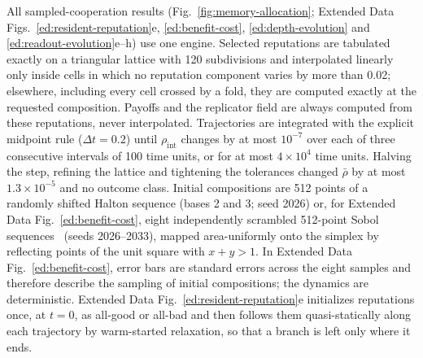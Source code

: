 All sampled-cooperation results (Fig.~\ref{fig:memory-allocation}; Extended
Data Figs.~\ref{ed:resident-reputation}e, \ref{ed:benefit-cost},
\ref{ed:depth-evolution} and \ref{ed:readout-evolution}e--h) use one engine.
Selected reputations are tabulated exactly on a triangular lattice with 120
subdivisions and interpolated linearly only inside cells in which no reputation
component varies by more than 0.02; elsewhere, including every cell crossed by
a fold, they are computed exactly at the requested composition. Payoffs and the
replicator field are always computed from these reputations, never
interpolated. Trajectories are integrated with the explicit midpoint rule
($\Delta t=0.2$) until $\rho_{\mathrm{int}}$ changes by at most $10^{-7}$ over
each of three consecutive intervals of 100 time units, or for at most
$4\times10^4$ time units. Halving the step, refining the lattice and tightening
the tolerances changed $\bar\rho$ by at most $1.3\times10^{-5}$ and no outcome
class. Initial compositions are 512 points of a randomly shifted Halton
sequence (bases 2 and 3; seed 2026) or, for Extended Data
Fig.~\ref{ed:benefit-cost}, eight independently scrambled 512-point Sobol
sequences~\cite{virtanen2020} (seeds 2026--2033), mapped area-uniformly onto the
simplex by reflecting points of the unit square with $x+y>1$. In Extended Data
Fig.~\ref{ed:benefit-cost}, error bars are standard errors across the eight
samples and therefore describe the sampling of initial compositions; the
dynamics are deterministic. Extended Data Fig.~\ref{ed:resident-reputation}e
initializes reputations once, at $t=0$, as all-good or all-bad and then follows
them quasi-statically along each trajectory by warm-started relaxation, so that
a branch is left only where it ends.

